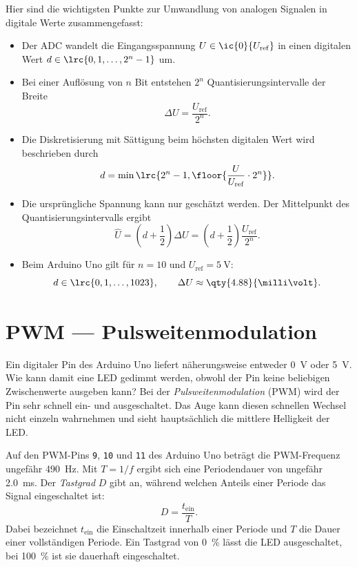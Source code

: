 \begin{mysummary}
    Hier sind die wichtigsten Punkte zur Umwandlung von analogen Signalen in digitale Werte zusammengefasst:
	\begin{itemize}
		\item Der ADC wandelt die Eingangsspannung $U \in \ic{0}{U_\mathrm{ref}}$ in einen digitalen Wert $d \in \lrc{0,1,\ldots,2^n-1}$ um.
		\item Bei einer Auflösung von $n$ Bit entstehen $2^n$ Quantisierungsintervalle der Breite
		\[
			\Delta U = \frac{U_\mathrm{ref}}{2^n}.
		\]
		\item Die Diskretisierung mit Sättigung beim höchsten digitalen Wert wird beschrieben durch
		\[
			d = \min\lrc{2^n-1,\floor{\frac{U}{U_\mathrm{ref}}\cdot 2^n}}.
		\]
		\item Die ursprüngliche Spannung kann nur geschätzt werden. Der Mittelpunkt des Quantisierungsintervalls ergibt
		\[
			\widehat{U} = \left(d + \frac{1}{2}\right)\Delta U
			= \left(d + \frac{1}{2}\right)\frac{U_\mathrm{ref}}{2^n}.
		\]
		\item Beim Arduino Uno gilt für $n=10$ und $U_\mathrm{ref}=\qty{5}{\volt}$:
		\[
			d \in \lrc{0,1,\ldots,1023},
			\qquad \Delta U \approx \qty{4.88}{\milli\volt}.
		\]
	\end{itemize}
\end{mysummary}


\clearpage
\section{PWM --- Pulsweitenmodulation}

Ein digitaler Pin des Arduino Uno liefert näherungsweise entweder \qty{0}{\volt} oder \qty{5}{\volt}. Wie kann damit eine LED gedimmt werden, obwohl der Pin keine beliebigen Zwischenwerte ausgeben kann? Bei der \emph{Pulsweitenmodulation} (PWM) wird der Pin sehr schnell ein- und ausgeschaltet. Das Auge kann diesen schnellen Wechsel nicht einzeln wahrnehmen und sieht hauptsächlich die mittlere Helligkeit der LED.

Auf den PWM-Pins \texttt{9}, \texttt{10} und \texttt{11} des Arduino Uno beträgt die PWM-Frequenz ungefähr \qty{490}{\hertz}. Mit $T=1/f$ ergibt sich eine Periodendauer von ungefähr \qty{2.0}{\milli\second}. Der \emph{Tastgrad} $D$ gibt an, während welchen Anteils einer Periode das Signal eingeschaltet ist:
\begin{equation}\label{eq:pwm-duty-cycle}
	D = \frac{t_\mathrm{ein}}{T}.
\end{equation}
Dabei bezeichnet $t_\mathrm{ein}$ die Einschaltzeit innerhalb einer Periode und $T$ die Dauer einer vollständigen Periode. Ein Tastgrad von \qty{0}{\percent} lässt die LED ausgeschaltet, bei \qty{100}{\percent} ist sie dauerhaft eingeschaltet.

